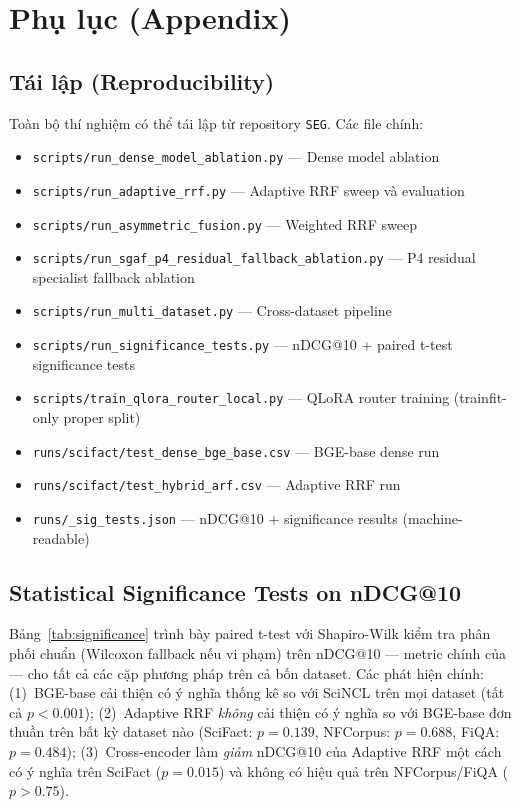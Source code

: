 \section{Phụ lục (Appendix)}

\subsection{Tái lập (Reproducibility)}

Toàn bộ thí nghiệm có thể tái lập từ repository \texttt{SEG}. Các file chính:

\begin{itemize}[leftmargin=1.6em,itemsep=1pt]
  \item \texttt{scripts/run\_dense\_model\_ablation.py} --- Dense model ablation
  \item \texttt{scripts/run\_adaptive\_rrf.py} --- Adaptive RRF sweep và evaluation
  \item \texttt{scripts/run\_asymmetric\_fusion.py} --- Weighted RRF sweep
  \item \texttt{scripts/run\_sgaf\_p4\_residual\_fallback\_ablation.py} --- P4 residual specialist fallback ablation
  \item \texttt{scripts/run\_multi\_dataset.py} --- Cross-dataset pipeline
  \item \texttt{scripts/run\_significance\_tests.py} --- nDCG@10 + paired t-test significance tests
  \item \texttt{scripts/train\_qlora\_router\_local.py} --- QLoRA router training (trainfit-only proper split)
  \item \texttt{runs/scifact/test\_dense\_bge\_base.csv} --- BGE-base dense run
  \item \texttt{runs/scifact/test\_hybrid\_arf.csv} --- Adaptive RRF run
  \item \texttt{runs/\_sig\_tests.json} --- nDCG@10 + significance results (machine-readable)
\end{itemize}

\subsection{Statistical Significance Tests on nDCG@10}
\label{sec:appendix:significance}

Bảng~\ref{tab:significance} trình bày paired t-test với Shapiro-Wilk kiểm tra phân phối chuẩn (Wilcoxon
fallback nếu vi phạm) trên nDCG@10 --- metric chính của \cite{aljoofi2025scifact} --- cho tất cả các cặp phương
pháp trên cả bốn dataset. Các phát hiện chính: (1)~BGE-base cải thiện có ý nghĩa thống kê so với SciNCL
trên mọi dataset (tất cả $p<0.001$); (2)~Adaptive RRF \emph{không} cải thiện có ý nghĩa so với
BGE-base đơn thuần trên bất kỳ dataset nào (SciFact: $p=0.139$, NFCorpus: $p=0.688$, FiQA: $p=0.484$);
(3)~Cross-encoder làm \emph{giảm} nDCG@10 của Adaptive RRF một cách có ý nghĩa trên SciFact ($p=0.015$)
và không có hiệu quả trên NFCorpus/FiQA ($p>0.75$).

